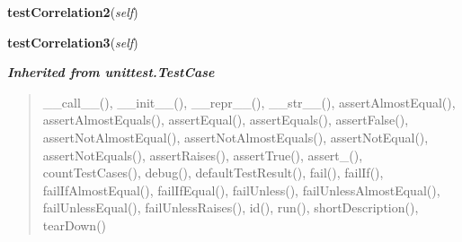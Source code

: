 \hspace{.8\funcindent}\begin{boxedminipage}{\funcwidth}

    \raggedright \textbf{testCorrelation2}(\textit{self})

\setlength{\parskip}{2ex}
\setlength{\parskip}{1ex}
    \end{boxedminipage}

    \label{nMOLDYN:Tests:AnalysisTests:AnalysisTest:testCorrelation3}

    \vspace{0.5ex}

\hspace{.8\funcindent}\begin{boxedminipage}{\funcwidth}

    \raggedright \textbf{testCorrelation3}(\textit{self})

\setlength{\parskip}{2ex}
\setlength{\parskip}{1ex}
    \end{boxedminipage}


\large{\textbf{\textit{Inherited from unittest.TestCase}}}

\begin{quote}
\_\_call\_\_(), \_\_init\_\_(), \_\_repr\_\_(), \_\_str\_\_(), assertAlmostEqual(), assertAlmostEquals(), assertEqual(), assertEquals(), assertFalse(), assertNotAlmostEqual(), assertNotAlmostEquals(), assertNotEqual(), assertNotEquals(), assertRaises(), assertTrue(), assert\_(), countTestCases(), debug(), defaultTestResult(), fail(), failIf(), failIfAlmostEqual(), failIfEqual(), failUnless(), failUnlessAlmostEqual(), failUnlessEqual(), failUnlessRaises(), id(), run(), shortDescription(), tearDown()
\end{quote}
